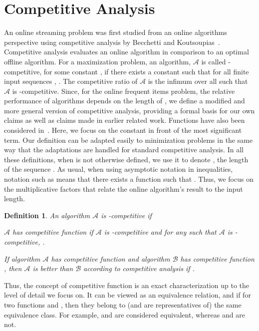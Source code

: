 \documentclass[11pt]{article}
\newtheorem{xdefinition}{Definition}
\newenvironment{definition}{\begin{xdefinition}\rm}{\hspace*{\fill}\raisebox{-1pt}{\boldmath}\end{xdefinition}}
\newcommand{\algA}{{\ensuremath{\mathcal{A}}}\xspace}
\newcommand{\algB}{{\ensuremath{\mathcal{B}}}\xspace}
\begin{document}
\section{Competitive Analysis}\label{sec:comp}
An online streaming problem was first studied from an online algorithms
perspective using competitive analysis by Becchetti and 
Koutsoupias~\cite{Becchetti09}.
Competitive analysis\cite{ST85,KMRS88} evaluates an online algorithm in comparison to an optimal offline algorithm.
For a maximization problem, an algorithm, \algA is called -competitive,
for some constant , if there exists a constant  such that for all finite input sequences , .
The competitive ratio of \algA is the infimum over all  such that \algA is -competitive.
Since, for the online frequent items problem, the relative performance of algorithms depends on the length of , we define
a modified and more general version of competitive analysis,
providing a formal basis for our own claims as well as claims made in
earlier related work.
Functions have also been considered in~\cite{DorrigivL05}.
Here, we focus on the constant in front of the most significant term.
Our definition can be adapted easily to minimization problems in the same
way that the adaptations are handled for standard competitive analysis.
In all these definitions, when  is not otherwise defined,
we use it to denote , the length of the
sequence . As usual, when using asymptotic notation in inequalities,
notation such as  means that there exists a
function  such that .
Thus, we focus on the multiplicative factors that relate the online
algorithm's result to the input length.

\begin{definition} \label{def:com}
An algorithm \algA is -{\em competitive} if

\algA has {\em competitive function}  if \algA is
-{\em competitive} and for any  such that \algA
is -{\em competitive},
.

If algorithm \algA has {\em competitive function}  and algorithm \algB has {\em competitive function} , then \algA is better than \algB according to competitive analysis if
.
\end{definition}


Thus, the concept of competitive function is an exact characterization
up to the level of detail we focus on. It can be viewed as an
equivalence relation, and if  for two
functions  and , then they belong to (and are representatives of)
the same equivalence class. For example,
 and  are
considered equivalent,
whereas  and  are not.
\end{document}

